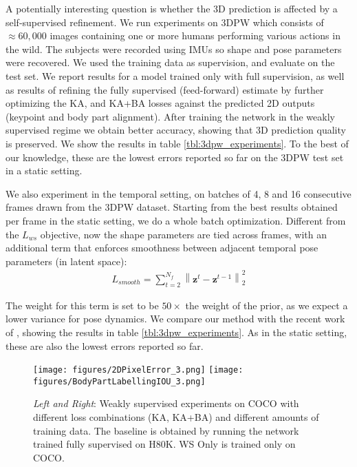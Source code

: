 \documentclass[runningheads]{llncs}
\newcommand{\zz}{\mathbf{z}}
\begin{document}
A potentially interesting question is whether the 3D prediction is affected by a self-supervised refinement. We run experiments on 3DPW \cite{vonMarcard2018} which consists of $\approx 60,000$ images containing one or more humans performing various actions in the wild. The subjects were recorded using IMUs so shape and pose parameters were recovered. We used the training data as supervision, and evaluate on the test set. We report results for a model trained only with full supervision, as well as results of refining the fully supervised (feed-forward) estimate by further optimizing the KA, and KA+BA losses against the predicted 2D outputs (keypoint and body part alignment). After training the network in the weakly supervised regime we obtain better accuracy, showing that 3D prediction quality is preserved. We show the results in table \ref{tbl:3dpw_experiments}. To the best of our knowledge, these are the lowest errors reported so far on the 3DPW test set in a static setting.

 We also experiment in the temporal setting, on batches of 4, 8 and 16 consecutive frames drawn from the 3DPW dataset. Starting from the best results obtained per frame in the static setting, we do a whole batch optimization. Different from the $L_{ws}$ objective, now the shape parameters are tied across frames, with an additional term that enforces smoothness between adjacent temporal pose parameters (in latent space):
\begin{align}
    L_{smooth} = \sum_{t=2}^{N_f} \left\|\zz^{t} -\zz^{t-1}\right\|_{2}^{2}
\end{align}

The weight for this term is set to be $50\times$ the weight of the prior, as we expect a lower variance for pose dynamics. We compare our method with the recent work of \cite{kocabas2019vibe}, showing the results in table \ref{tbl:3dpw_experiments}. As in the static setting, these are also the lowest errors reported so far.


\begin{figure}[!htbp]
\begin{center}
    \texttt{[image: figures/2DPixelError\_3.png]}
    \texttt{[image: figures/BodyPartLabellingIOU\_3.png]}
\end{center}

\caption{\small \textit{Left and Right}: Weakly supervised experiments on COCO with different loss combinations (KA, KA+BA) and different amounts of training data. The baseline is obtained by running the network trained fully supervised on H80K. WS Only is trained only on COCO.}
\label{fig:ka-kb-weight_sensitivity-figure}
\end{figure}
\end{document}
